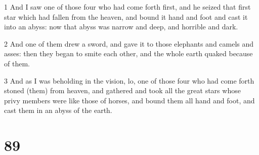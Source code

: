 \par 1 And I saw one of those four who had come forth first, and he seized that first star which had fallen from the heaven, and bound it hand and foot and cast it into an abyss: now that abyss was narrow and deep, and horrible and dark.
\par 2 And one of them drew a sword, and gave it to those elephants and camels and asses: then they began to smite each other, and the whole earth quaked because of them.
\par 3 And as I was beholding in the vision, lo, one of those four who had come forth stoned (them) from heaven, and gathered and took all the great stars whose privy members were like those of horses, and bound them all hand and foot, and cast them in an abyss of the earth.

\chapter{89}

